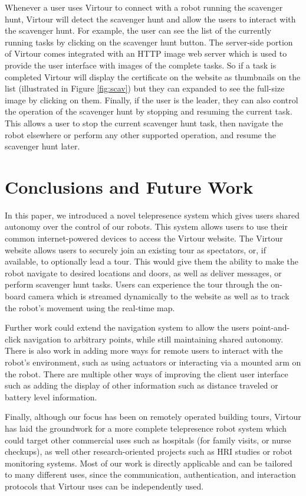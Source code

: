 \documentclass[
  oneside,
  11pt, a4paper,
  footinclude=true,
  headinclude=true,
  cleardoublepage=empty
]{article}
\begin{document}
Whenever a user uses Virtour to connect with a robot running the scavenger
hunt, Virtour will detect the scavenger hunt and allow the users to interact
with the scavenger hunt. For example, the user can see the list of the
currently running tasks by clicking on the scavenger hunt button. The
server-side portion of Virtour comes integrated with an HTTP image web server
which is used to provide the user interface with images of the complete tasks.
So if a task is completed Virtour will display the certificate on the website
as thumbnails on the list (illustrated in Figure \ref{fig:scav}) but they can
expanded to see the full-size image by clicking on them. Finally, if the user
is the leader, they can also control the operation of the scavenger hunt by
stopping and resuming the current task. This allows a user to stop the current
scavenger hunt task, then navigate the robot elsewhere or perform any other
supported operation, and resume the scavenger hunt later.

\section{Conclusions and Future Work}\label{sec:conclusion}

In this paper, we introduced a novel telepresence system which gives users
shared autonomy over the control of our robots. This system allows users to use
their common internet-powered devices to access the Virtour website. The
Virtour website allows users to securely join an existing tour as spectators,
or, if available, to optionally lead a tour. This would give them the ability
to make the robot navigate to desired locations and doors, as well as deliver
messages, or perform scavenger hunt tasks. Users can experience the tour
through the on-board camera which is streamed dynamically to the website as
well as to track the robot's movement using the real-time map.

Further work could extend the navigation system to allow the users
point-and-click navigation to arbitrary points, while still maintaining shared
autonomy. There is also work in adding more ways for remote users to interact
with the robot's environment, such as using actuators or interacting via a
mounted arm on the robot. There are multiple other ways of improving the client
user interface such as adding the display of other information such as distance
traveled or battery level information.

Finally, although our focus has been on remotely operated building tours,
Virtour has laid the groundwork for a more complete telepresence robot system
which could target other commercial uses such as hospitals (for family visits,
or nurse checkups), as well other research-oriented projects such as HRI
studies or robot monitoring systems. Most of our work is directly applicable
and can be tailored to many different uses, since the communication,
authentication, and interaction protocols that Virtour uses can be independently
used.
\end{document}
